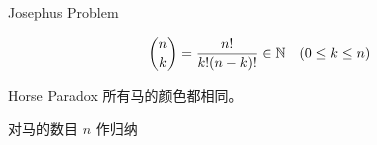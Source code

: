 \begin{frame}{}
\end{frame}

\begin{frame}{}
\end{frame}

\begin{frame}{}
  \begin{exampleblock}{Josephus Problem}
  \end{exampleblock}
\end{frame}

\begin{frame}{}
  \begin{exampleblock}{}
    \[
      \binom{n}{k} = \frac{n!}{k! (n-k)!} \in \mathbb{N} \quad (0 \le k \le n)
    \]
  \end{exampleblock}
\end{frame}

\begin{frame}{}
  \begin{exampleblock}{Horse Paradox}
    所有马的颜色都相同。
  \end{exampleblock}

  \pause
  \vspace{0.50cm}
  \begin{center}
    对马的数目 $n$ 作归纳

    \pause
  \end{center}
\end{frame}

